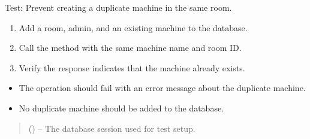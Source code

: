 \documentclass[letterpaper,10pt,english]{sphinxmanual}
\begin{document}
\begin{fulllineitems}
\label{\detokenize{test:test.test_machine.test_create_machine_duplicate}}
\pysigstartsignatures
\pysiglinewithargsret
{}
{}
{}
\pysigstopsignatures
\sphinxAtStartPar
Test: Prevent creating a duplicate machine in the same room.
\begin{description}
\begin{enumerate}
%
\item {} 
\sphinxAtStartPar
Add a room, admin, and an existing machine to the database.

\item {} 
\sphinxAtStartPar
Call the  method with the same machine name and room ID.

\item {} 
\sphinxAtStartPar
Verify the response indicates that the machine already exists.

\end{enumerate}

\begin{itemize}
\item {} 
\sphinxAtStartPar
The operation should fail with an error message about the duplicate machine.

\item {} 
\sphinxAtStartPar
No duplicate machine should be added to the database.

\end{itemize}

\end{description}
\begin{quote}\begin{description}
\sphinxAtStartPar
{} () – The database session used for test setup.

\end{description}\end{quote}

\end{fulllineitems}

\end{document}
